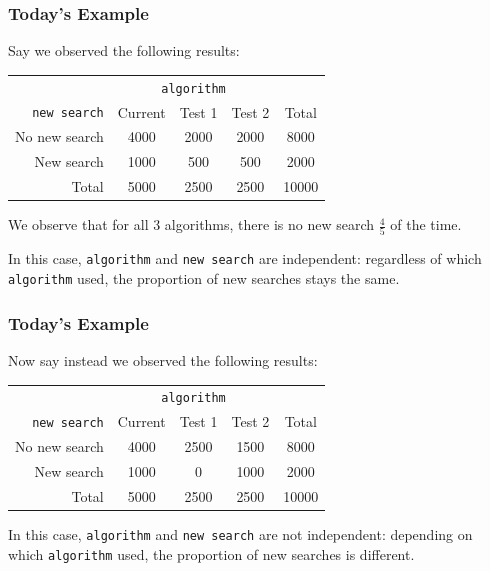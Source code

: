 \documentclass[slides]{beamer}
\newcommand{\blue}[1]{\textcolor{blue2}{#1}}
\begin{document}
\begin{frame}
\frametitle{Today's Example}

Say we observed the following results:

\begin{center}
  \begin{tabular}{r|ccc|c}
& \multicolumn{3}{c|}{{\tt algorithm}} & \\
       {\tt new search} & Current & Test 1 & Test 2 & Total \\ 
\hline
    No new search & 4000 & 2000 & 2000 & 8000 \\ 
    New search & 1000 & 500 & 500 & 2000 \\ 
\hline
    Total & 5000 & 2500 & 2500 & 10000 \\ 
  \end{tabular}
\end{center}

\pause We observe that for all 3 algorithms, there is no new search $\frac{4}{5}$ of the time.

\vspace{0.25cm}

\pause In this case, {\tt algorithm} and {\tt new search} are \blue{independent}: \blue{regardless of} which {\tt algorithm} used, the proportion of new searches \blue{stays the same}.

\end{frame}


\begin{frame}
\frametitle{Today's Example}

Now say instead we observed the following results:

\begin{center}
  \begin{tabular}{r|ccc|c}
& \multicolumn{3}{c|}{{\tt algorithm}} & \\
       {\tt new search} & Current & Test 1 & Test 2 & Total \\ 
\hline
    No new search & 4000 & 2500 & 1500 & 8000 \\ 
    New search & 1000 & 0 & 1000 & 2000 \\ 
\hline
    Total & 5000 & 2500 & 2500 & 10000 \\ 
  \end{tabular}
\end{center}

\vspace{0.25cm}

\pause In this case, {\tt algorithm} and {\tt new search} are \blue{not independent}: \blue{depending on} which {\tt algorithm} used, the proportion of new searches \blue{is different}.

\end{frame}
\end{document}
